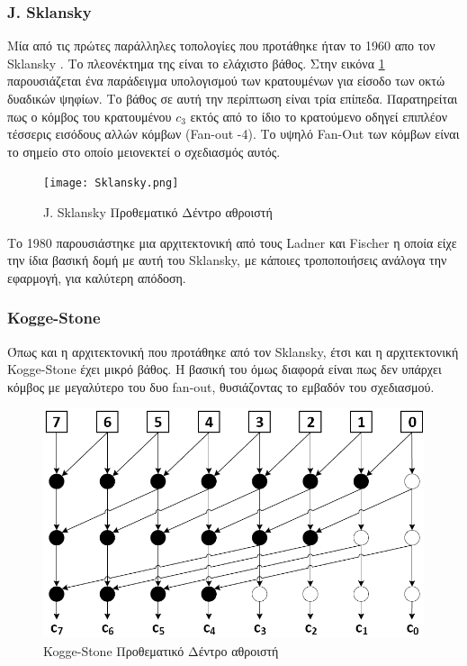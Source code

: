 \subsubsection*{J. Sklansky}
Μία από τις πρώτες παράλληλες τοπολογίες που προτάθηκε ήταν το 1960 απο τον Sklansky \cite{5219822}. Το πλεονέκτημα της είναι το ελάχιστο βάθος. Στην εικόνα \ref{SklanskyTree} παρουσιάζεται ένα παράδειγμα υπολογισμού των κρατουμένων για είσοδο των οκτώ δυαδικών ψηφίων. Το βάθος σε αυτή την περίπτωση είναι τρία επίπεδα. Παρατηρείται πως ο κόμβος του κρατουμένου $c_3$ εκτός από το ίδιο το κρατούμενο οδηγεί επιπλέον τέσσερις εισόδους αλλών κόμβων (Fan-out -4). Το υψηλό Fan-Out των κόμβων είναι το σημείο στο οποίο μειονεκτεί ο σχεδιασμός αυτός.
\begin{figure}[H]
    \centering
    \texttt{[image: Sklansky.png]}
    \caption{J. Sklansky Προθεματικό Δέντρο αθροιστή}
    \label{SklanskyTree}
\end{figure}
Το 1980 παρουσιάστηκε μια αρχιτεκτονική από τους Ladner και Fischer 
\cite{Ladner:1980:PPC:322217.322232} η οποία είχε την ίδια βασική δομή με αυτή του
Sklansky, με κάποιες τροποποιήσεις ανάλογα την εφαρμογή, για καλύτερη απόδοση.





\subsubsection*{Kogge-Stone}
Όπως και η αρχιτεκτονική που προτάθηκε από τον Sklansky, έτσι και η αρχιτεκτονική
Kogge-Stone \cite{5009159} έχει μικρό βάθος. Η βασική του όμως διαφορά είναι πως δεν υπάρχει 
κόμβος με μεγαλύτερο του δυο fan-out, θυσιάζοντας το εμβαδόν του σχεδιασμού.
\begin{figure}[H]
    \centering
    \includegraphics[scale=0.45]{Pictures/Kogge-Stone.png}
    \caption{Kogge-Stone Προθεματικό Δέντρο αθροιστή}
    \label{Kogge-StoneTree}
\end{figure}






